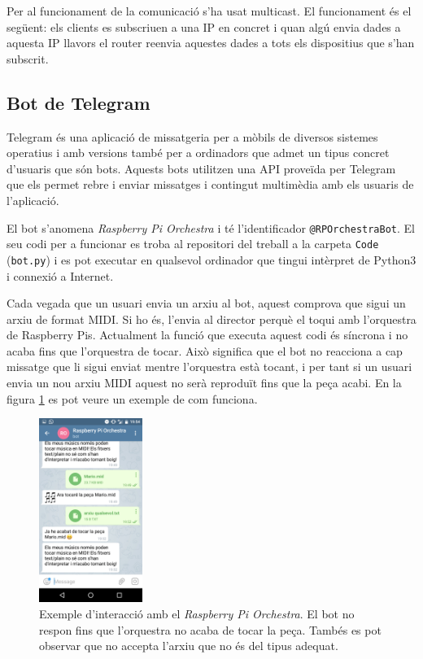 \documentclass[a4paper]{paper}
\begin{document}
Per al funcionament de la comunicació s'ha usat multicast. El funcionament és el següent: els clients es subscriuen a una IP en concret i quan algú envia dades a aquesta IP llavors el router reenvia aquestes dades a tots els dispositius que s'han subscrit.



\subsection{Bot de Telegram}
Telegram\cite{telegram} és una aplicació de missatgeria per a mòbils de diversos sistemes operatius i amb versions també per a ordinadors que admet un tipus concret d'usuaris que són bots. Aquests bots utilitzen una API proveïda per Telegram que els permet rebre i enviar missatges i contingut multimèdia amb els usuaris de l'aplicació.

El bot s'anomena \emph{Raspberry Pi Orchestra} i té l'identificador \texttt{@RPOrchestraBot}. El seu codi per a funcionar es troba al repositori del treball a la carpeta \texttt{Code} (\texttt{bot.py}) i es pot executar en qualsevol ordinador que tingui intèrpret de Python3 i connexió a Internet.

Cada vegada que un usuari envia un arxiu al bot, aquest comprova que sigui un arxiu de format MIDI. Si ho és, l'envia al director perquè el toqui amb l'orquestra de Raspberry Pis. Actualment la funció que executa aquest codi és síncrona i no acaba fins que l'orquestra de tocar. Això significa que el bot no reacciona a cap missatge que li sigui enviat mentre l'orquestra està tocant, i per tant si un usuari envia un nou arxiu MIDI aquest no serà reproduït fins que la peça acabi. En la figura \ref{fig:screenshot_bot} es pot veure un exemple de com funciona.

\begin{figure}
	\label{fig:screenshot_bot}
	\centering
	\includegraphics[width=0.3\textwidth]{images/screenshot_bot.png}
	\caption{Exemple d'interacció amb el \emph{Raspberry Pi Orchestra}. El bot no respon fins que l'orquestra no acaba de tocar la peça. Tambés es pot observar que no accepta l'arxiu que no és del tipus adequat.}
\end{figure}
\end{document}
